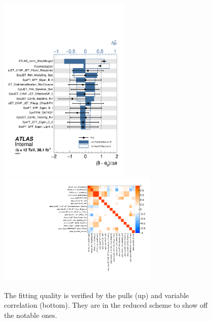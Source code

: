 \begin{figure}[!ht]
	\centering
	\includegraphics[width=0.56\textwidth]{Chapter5/ranking_data_1lepCR.pdf}	
	\includegraphics[width=0.68\textwidth]{Chapter5/corr_data_1lepCR.pdf}	
	\caption{\label{Fig:fit_quality} The fitting quality is verified by the pulls (up) and variable correlation (bottom). They are in the reduced scheme to show off the notable ones.  
	}
\end{figure}

